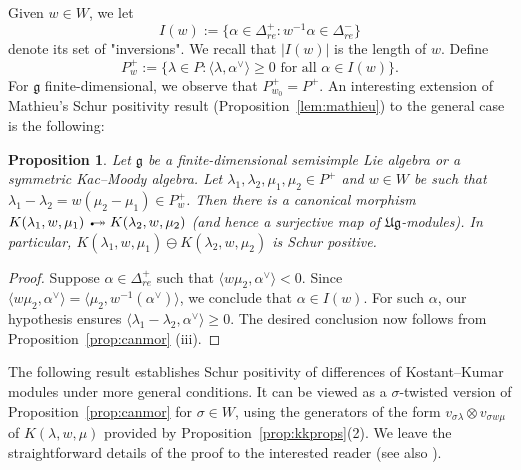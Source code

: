 \documentclass[12pt,reqno]{amsart}
\theoremstyle{plain}
\newtheorem{proposition}[theorem]{Proposition}
\theoremstyle{definition}
\theoremstyle{remark}
\theoremstyle{plain}
\newcommand{\posreal}[1][+]{\Delta_{re}^{#1}}
\newcommand{\lie}{\mathfrak}
\newcommand{\twoheadrightarrowtail}{%
  \mathrel{\mathrlap{\scalebox{0.75}{\textbullet}}\twoheadrightarrow}}
\newcommand{\canmor}{\twoheadrightarrowtail}
\begin{document}
\subsection{}
 Given $w \in W$, we let \[I(w) :=\{ \alpha\in \posreal:  w^{-1}\alpha \in \posreal[-]\}\]
 denote its set of "inversions". We recall that $|I(w)|$ is the length of $w$. Define
\[ P_w^+ :=\{\lambda \in P: \langle \lambda, \alpha^\vee \rangle \geq 0 \text{ for all } \alpha\in I(w)\}.\]
For $\lie g$ finite-dimensional, we observe that $P_{w_0}^+ = P^+$. 
%
An interesting extension of Mathieu's Schur positivity result (Proposition~\ref{lem:mathieu}) to the general case is the following:
\begin{proposition}
    \label{lem:mathieu-infinite}
Let $\lie g$ be a finite-dimensional semisimple Lie algebra or a symmetric Kac--Moody algebra. Let $\lambda_1, \lambda_2, \mu_1, \mu_2 \in P^+$ and $w \in W$ be such that $\lambda_1 - \lambda_2 = w(\mu_2 - \mu_1) \in P_w^+$. Then there is a canonical morphism  $K(\lambda_1, w, \mu_1) \canmor K(\lambda_2, w, \mu_2)$ (and hence a surjective map of $\lie{Ug}$-modules). In particular, 
$K(\lambda_1,w,\mu_1) \ominus K(\lambda_2, w, \mu_2)$  is Schur positive.
\end{proposition}
\begin{proof}
Suppose $\alpha \in \posreal$ such that $\langle w\mu_2, \alpha^\vee\rangle <0$. Since $\langle w\mu_2, \alpha^\vee\rangle = \langle \mu_2, w^{-1}(\alpha^\vee) \rangle$, we conclude that $\alpha \in I(w)$. For such $\alpha$, our hypothesis ensures $\langle \lambda_1 - \lambda_2, \alpha^\vee \rangle \geq 0$. The desired conclusion now follows from Proposition~\ref{prop:canmor} (iii).
\end{proof}

The following result establishes Schur positivity of differences of Kostant--Kumar modules under more general conditions. It can be viewed as a $\sigma$-twisted version of Proposition~\ref{prop:canmor} for $\sigma \in W$, using the generators of the form $v_{\sigma \lambda} \otimes v_{\sigma w\mu}$ of $K(\lambda,w,\mu)$ provided by Proposition~\ref{prop:kkprops}(2). We leave the straightforward details of the proof to the interested reader (see also \cite{manika-thesis}).
\end{document}
